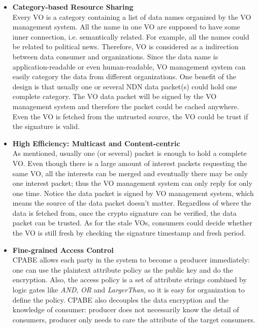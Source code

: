 \begin{itemize}
\item \textbf{Category-based Resource Sharing} \\
Every VO is a category containing a list of data names organized by the VO management system.
All the name in one VO are supposed to have some inner connection, i.e. semantically related.
For example, all the names could be related to political news.
Therefore, VO is considered as a indirection between data consumer and organizations.
Since the data name is application-readable or even human-readable, VO management system can easily category the data from different organizations.
One benefit of the design is that usually one or several NDN data packet(s) could hold one complete category.
The VO data packet will be signed by the VO management system and therefore the packet could be cached anywhere.
Even the VO is fetched from the untrusted source, the VO could be trust if the signature is valid.
\item \textbf{High Efficiency: Multicast and Content-centric} \\
As mentioned, usually one (or several) packet is enough to hold a complete VO.
Even though there is a large amount of interest packets requesting the same VO, all the interests can be merged and eventually there may be only one interest packet; thus the VO management system can only reply for only one time.
Notice the data packet is signed by VO management system, which means the source of the data packet doesn't matter.
Regardless of where the data is fetched from, once the crypto signature can be verified, the data packet can be trusted.
As for the stale VOs, consumers could decide whether the VO is still fresh by checking the signature timestamp and fresh period.
\item \textbf{Fine-grained Access Control} \\
CPABE allows each party in the system to become a producer immediately: one can use the plaintext attribute policy as the public key and do the encryption.
Also, the access policy is a set of attribute strings combined by logic gates like \textit{AND}, \textit{OR} and \textit{LargerThan}, so it is easy for organization to define the policy.
CPABE also decouples the data encryption and the knowledge of consumer: producer does not necessarily know the detail of consumers, producer only needs to care the attribute of the target consumers.
\end{itemize}